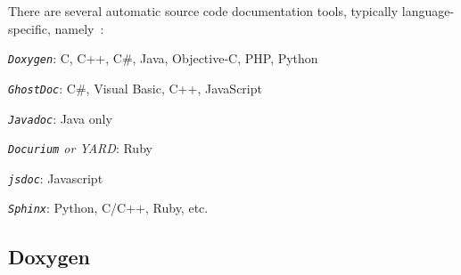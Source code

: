 There are several automatic source code documentation tools, typically
language-specific, namely~\cite{sourceCodeDocBestPractices}:
\begin{item-c}
\item \emph{\texttt{Doxygen}}: C, C++, C\#, Java, Objective-C, PHP, Python
\item \emph{\texttt{GhostDoc}}: C\#, Visual Basic, C++, JavaScript
\item \emph{\texttt{Javadoc}}: Java only
\item \emph{\texttt{Docurium} or \emph{YARD}}: Ruby
\item \emph{\texttt{jsdoc}}: Javascript
\item \emph{\texttt{Sphinx}}: Python, C/C++, Ruby, etc.
\end{item-c}

\subsection{Doxygen}
\label{sec:doxygen}



